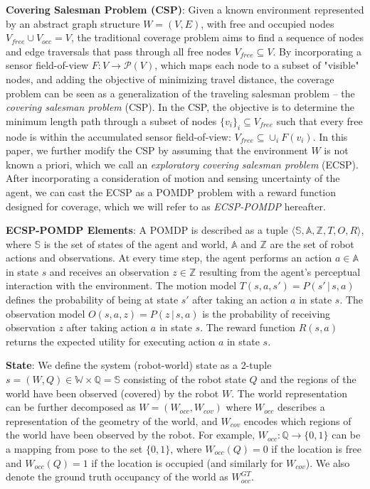 \documentclass[letterpaper]{article} %
\newcommand{\ph}[1]{{\textbf{#1}:}} %
\begin{document}
\ph{Covering Salesman Problem (CSP)} Given a known environment represented by an abstract graph structure $W = (V, E)$, with free and occupied nodes $V_{free}\cup V_{occ} = V$, the traditional coverage problem aims to find a sequence of nodes and edge traversals that pass through all free nodes $V_{free} \subseteq V$.  By incorporating a sensor field-of-view $F:V\rightarrow \mathcal{P}(V)$, which maps each node to a subset of "visible" nodes, and adding the objective of minimizing travel distance, the coverage problem can be seen as a generalization of the traveling salesman problem -- the \emph{covering salesman problem} (CSP).  In the CSP, the objective is to determine the minimum length path through a subset of nodes $\{v_i\}_i \subseteq V_{free}$ such that every free node is within the accumulated sensor field-of-view: $V_{free} \subseteq \cup_i F(v_i)$.
In this paper, we further modify the CSP by assuming that the environment $W$ is not known a priori, which we call an \emph{exploratory covering salesman problem} (ECSP).  After incorporating a consideration of motion and sensing uncertainty of the agent, we can cast the ECSP as a POMDP problem with a reward function designed for coverage, which we will refer to as \emph{ECSP-POMDP} hereafter.

\ph{ECSP-POMDP Elements} A POMDP is described as a tuple $\langle \mathbb{S}, \mathbb{A}, \mathbb{Z}, T, O, R \rangle$, where $\mathbb{S}$ is the set of states of the agent and world, $\mathbb{A}$ and $\mathbb{Z}$ are the set of robot actions and observations. At every time step, the agent performs an action $a \in \mathbb{A}$ in state $s$ and receives an observation $z \in \mathbb{Z}$ resulting from the agent's perceptual interaction with the environment. The motion model $T(s, a, s') = P(s'\,|\,s, a)$ defines the probability of being at state $s'$ after taking an action $a$ in state $s$. The observation model $O(s, a, z) = P(z\,|\,s, a)$ is the probability of receiving observation $z$ after taking action $a$ in state $s$. The reward function $R(s,a)$ returns the expected utility for executing action $a$ in state $s$.

\ph{State} We define the system (robot-world) state as a 2-tuple $s = (W, Q) \in \mathbb{W}\times\mathbb{Q} =  \mathbb{S}$ consisting of the robot state $Q$ and the regions of the world have been observed (covered) by the robot $W$. The world representation can be further decomposed as $W = (W_{occ}, W_{cov})$ where $W_{occ}$ describes a representation of the geometry of the world, and $W_{cov}$ encodes which regions of the world have been observed by the robot.  For example, $W_{occ}:\mathbb{Q}\rightarrow\{0,1\}$ can be a mapping from pose to the set $\{0,1\}$, where $W_{occ}(Q) = 0$ if the location is free and $W_{occ}(Q) = 1$ if the location is occupied (and similarly for $W_{cov}$).  We also denote the ground truth occupancy of the world as $W_{occ}^{GT}$.
\end{document}
